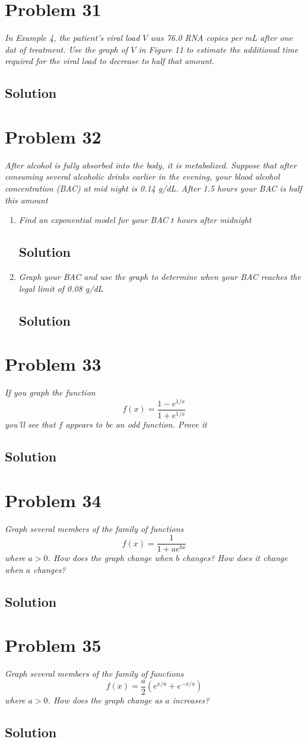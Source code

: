 \documentclass[11pt]{article}
\newcommand{\soln}{\subsection*}
\newcommand{\qn}{\textit}
\begin{document}
\section*{Problem 31}

\qn{In Example 4, the patient's viral load $V$ was 76.0 RNA copies per mL after one dat of treatment. Use the graph of $V$ in Figure 11 to estimate the additional time required for the viral load to decrease to half that amount.}

\soln{Solution}

\section*{Problem 32}

\qn{After alcohol is fully absorbed into the body, it is metabolized. Suppose that after consuming several alcoholic drinks earlier in the evening, your blood alcohol concentration (BAC) at mid night is 0.14 g/dL. After 1.5 hours your BAC is half this amount}

\begin{enumerate}
	\item \qn{Find an exponential model for your BAC $t$ hours after midnight}
	\soln{Solution}
	
	\item \qn{Graph your BAC and use the graph to determine when your BAC reaches the legal limit of 0.08 g/dL}
	\soln{Solution}
\end{enumerate}

\section*{Problem 33}

\qn{If you graph the function $$f(x)=\frac{1-e^{1/x}}{1+e^{1/x}}$$ you'll see that $f$ appears to be an odd function. Prove it}

\soln{Solution}

\section*{Problem 34}

\qn{Graph several members of the family of functions $$f(x)=\frac{1}{1+ae^{bx}}$$ where $a>0$. How does the graph change when $b$ changes? How does it change when $a$ changes?}

\soln{Solution}

\section*{Problem 35}

\qn{Graph several members of the family of functions $$f(x)=\frac{a}{2}(e^{x/a}+e^{-x/a})$$ where $a>0$. How does the graph change as $a$ increases?}

\soln{Solution}
\end{document}
